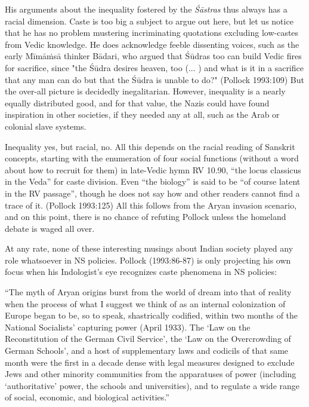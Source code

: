 His arguments about the inequality fostered by the {\sl Śāstras} thus always has a racial dimension. Caste is too big a subject to argue out here, but let us notice that he has no problem mustering incriminating quotations excluding low-castes from Vedic knowledge. He does acknowledge feeble dissenting voices, such as the early Mīmāṁsā thinker Bādari, who argued that Śūdras too can build Vedic fires for sacrifice, since "the Śūdra desires heaven, too ($\ldots$ ) and what is it in a sacrifice that any man can do but that the Śūdra is unable to do?" (Pollock 1993:109) But the over-all picture is decidedly inegalitarian. However, inequality is a nearly equally distributed good, and for that value, the Nazis could have found inspiration in other societies, if they needed any at all, such as the Arab or colonial slave systems.

Inequality yes, but racial, no. All this depends on the racial reading of Sanskrit concepts, starting with the enumeration of four social functions (without a word about how to recruit for them) in late-Vedic hymn RV 10.90, “the locus classicus in the Veda” for caste division. Even “the biology” is said to be “of course latent in the RV passage”, though he does not say how and other readers cannot find a trace of it. (Pollock 1993:125) All this follows from the Aryan invasion scenario, and on this point, there is no chance of refuting Pollock unless the homeland debate is waged all over. 

At any rate, none of these interesting musings about Indian society played any role whatsoever in NS policies. Pollock (1993:86-87) is only projecting his own focus when his Indologist’s eye recognizes caste phenomena in NS policies: 
\medskip

\begin{myquote}
“The myth of Aryan origins burst from the world of dream into that of reality when the process of what I suggest we think of as an internal colonization of Europe began to be, so to speak, shastrically codified, within two months of the National Socialists' capturing power (April 1933). The ‘Law on the Reconstitution of the German Civil Service’, the ‘Law on the Overcrowding of German Schools’, and a host of supplementary laws and codicils of that same month were the first in a decade dense with legal measures designed to exclude Jews and other minority communities from the apparatuses of power (including ‘authoritative’ power, the schools and universities), and to regulate a wide range of social, economic, and biological activities.” 
\end{myquote}

